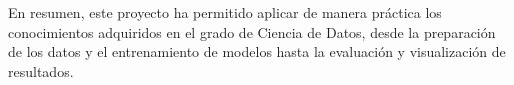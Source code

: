\documentclass[11pt,spanish,listoffigures,listoftables]{tfgetsinf}
\begin{document}
En resumen, este proyecto ha permitido aplicar de manera práctica los conocimientos adquiridos en el grado de Ciencia de Datos, desde la preparación de los datos y el entrenamiento de modelos hasta la evaluación y visualización de resultados.








\cleardoublepage


\appendix












\end{document}
